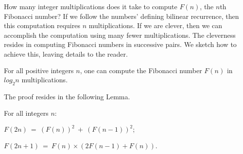 How many integer multiplications does it take to compute $F(n)$, the $n$th Fibonacci number?  If we follow the numbers' defining bilinear recurrence, then this computation requires $n$ multiplications.  If we are clever, then we can accomplish the computation using many fewer multiplications.  The cleverness resides in computing Fibonacci numbers in successive pairs.  We sketch how to achieve this, leaving details to the reader.

\begin{prop}
For all positive integers $n$, one can compute the Fibonacci number $F(n)$ in $log_2 n$ multiplications.
\end{prop}

The proof resides in the following Lemma.

\begin{lemma}
For all integers $n$:

$F(2n) \ = \ (F(n))^2 \ + \ (F(n-1))^2$;

\smallskip

$F(2n+1) \ = \  F(n) \times (2 F(n-1) + F(n))$.
\end{lemma}

\smallskip

